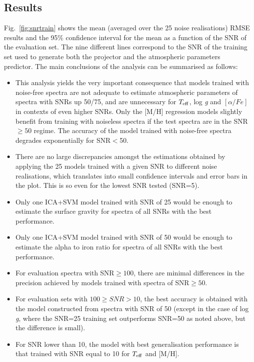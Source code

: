 \documentclass[a4paper,fleqn,usenatbib]{mnras}
\begin{document}
{{{\subsection{Results}

Fig.~\ref{fig:snrtrain} shows the mean (averaged over the 25 noise
realisations) RMSE results and the 95\% confidence interval for the
mean as a function of the SNR of the evaluation set. The nine
different lines correspond to the SNR of the training set used to
generate both the projector and the atmospheric parameters predictor.
The main conclusions of the analysis can be summarised as follows:

\begin{itemize}
\item This analysis yields the very important consequence that models
  trained with noise-free spectra are not adequate to estimate
  atmospheric parameters of spectra with SNRs up 50/75, and are
  unnecessary for $T_{\rm eff}$, log \textit{g} and $\left[ \alpha/Fe 
  \right]$ in contexts of even higher SNRs. Only the [M/H] regression 
  models slightly benefit from training with noiseless spectra if the test 
  spectra are in the SNR$\ge 50$ regime. The accuracy of the model 
  trained with noise-free spectra degrades exponentially for SNR$<$50.
\item There are no large discrepancies amongst the estimations
  obtained by applying the 25 models trained with a given SNR to
  different noise realisations, which translates into small confidence
  intervals and error bars in the plot. This is so even for the lowest
  SNR tested (SNR=5).
\item Only one ICA+SVM model trained with SNR of 25 would be enough to
  estimate the surface gravity for spectra of all SNRs with the best
  performance.
\item Only one ICA+SVM model trained with SNR of 50 would be enough to
  estimate the alpha to iron ratio for spectra of all SNRs with 
  the best performance.
\item For evaluation spectra with SNR$\ge 100$, there are minimal
  differences in the precision achieved by models trained with spectra
  of SNR$\ge 50$.  
\item For evaluation sets with $100\ge SNR > 10$, the best accuracy is
  obtained with the model constructed from spectra with SNR of 50
  (except in the case of log {\it g}, where the SNR=25 training set
  outperforms SNR=50 as noted above, but the difference is small).
\item For SNR lower than 10, the model with best generalisation
  performance is that trained with SNR equal to 10 for $T_{\rm eff}$ 
  and [M/H]. 
\end{itemize}

}}}
\end{document}
